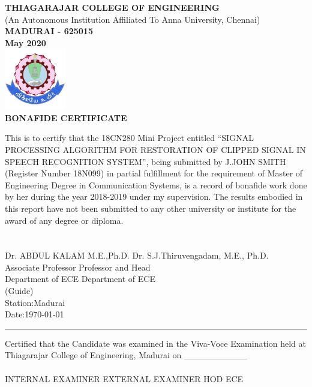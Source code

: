 \documentclass[a4paper,12pt]{report} %
\begin{document}
\thispagestyle{plain}
\begin{center}
     \Large\textbf{THIAGARAJAR COLLEGE OF ENGINEERING}\\
       \normalsize (An Autonomous Institution Affiliated To Anna University, Chennai)\\
        \Large\textbf{MADURAI - 625015}\\
       \large \textbf{May 2020}\\
   \includegraphics[width=0.2\textwidth]{TCE}\\
    \vspace{0.3cm}
    \large
   \Large\textbf{BONAFIDE CERTIFICATE}
   
\end{center}
\normalsize

   This is to certify that the 18CN280 Mini Project entitled “SIGNAL PROCESSING ALGORITHM FOR RESTORATION OF CLIPPED SIGNAL IN SPEECH RECOGNITION SYSTEM”, being submitted by J.JOHN SMITH (Register Number 18N099) in partial fulfillment for the requirement of Master of Engineering Degree in Communication Systems, is a record of bonafide work done by her during the year 2018-2019 under my supervision. The results embodied in this report have not been submitted to any other university or institute for the award of any degree or diploma.\\\\\\
 \hfill
 Dr. ABDUL KALAM M.E.,Ph.D.
 \hfill
Dr. S.J.Thiruvengadam, M.E., Ph.D. \\
 Associate Professor
 \hfill Professor and Head\\
 Department of ECE
 \hfill  Department of ECE\\
 (Guide)\\
 Station:Madurai\\
 Date:\today
\par\noindent\rule{\textwidth}{0.4pt}
 Certified that the Candidate was examined in the Viva-Voce Examination held at Thiagarajar College of Engineering, Madurai on \_\_\_\_\_\_\_\_\_\_\\\\
 
\noindent INTERNAL EXAMINER \hspace{1.5cm} EXTERNAL EXAMINER \hspace{1.5cm}HOD ECE
\end{document}
